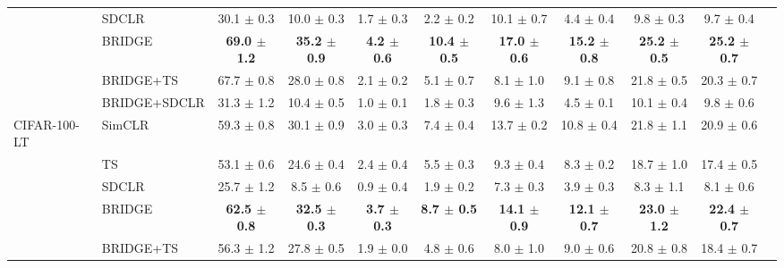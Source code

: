 \begin{table}[t]
\begin{adjustbox}{max width=\textwidth}
\begin{tabular}{l l c c c c c c c c c}
 & SDCLR & 30.1 {\scriptsize$\pm$ 0.3} & 10.0 {\scriptsize$\pm$ 0.3} & 1.7 {\scriptsize$\pm$ 0.3} & 2.2 {\scriptsize$\pm$ 0.2} & 10.1 {\scriptsize$\pm$ 0.7} & 4.4 {\scriptsize$\pm$ 0.4} & 9.8 {\scriptsize$\pm$ 0.3} & 9.7 {\scriptsize$\pm$ 0.4} \\
 & BRIDGE & \textbf{69.0 {\scriptsize$\pm$ 1.2}} & \textbf{35.2 {\scriptsize$\pm$ 0.9}} & \textbf{4.2 {\scriptsize$\pm$ 0.6}} & \textbf{10.4 {\scriptsize$\pm$ 0.5}} & \textbf{17.0 {\scriptsize$\pm$ 0.6}} & \textbf{15.2 {\scriptsize$\pm$ 0.8}} & \textbf{25.2 {\scriptsize$\pm$ 0.5}} & \textbf{25.2 {\scriptsize$\pm$ 0.7}} \\
 & BRIDGE+TS & 67.7 {\scriptsize$\pm$ 0.8} & 28.0 {\scriptsize$\pm$ 0.8} & 2.1 {\scriptsize$\pm$ 0.2} & 5.1 {\scriptsize$\pm$ 0.7} & 8.1 {\scriptsize$\pm$ 1.0} & 9.1 {\scriptsize$\pm$ 0.8} & 21.8 {\scriptsize$\pm$ 0.5} & 20.3 {\scriptsize$\pm$ 0.7} \\
 & BRIDGE+SDCLR & 31.3 {\scriptsize$\pm$ 1.2} & 10.4 {\scriptsize$\pm$ 0.5} & 1.0 {\scriptsize$\pm$ 0.1} & 1.8 {\scriptsize$\pm$ 0.3} & 9.6 {\scriptsize$\pm$ 1.3} & 4.5 {\scriptsize$\pm$ 0.1} & 10.1 {\scriptsize$\pm$ 0.4} & 9.8 {\scriptsize$\pm$ 0.6} \\
\midrule
CIFAR-100-LT & SimCLR & 59.3 {\scriptsize$\pm$ 0.8} & 30.1 {\scriptsize$\pm$ 0.9} & 3.0 {\scriptsize$\pm$ 0.3} & 7.4 {\scriptsize$\pm$ 0.4} & 13.7 {\scriptsize$\pm$ 0.2} & 10.8 {\scriptsize$\pm$ 0.4} & 21.8 {\scriptsize$\pm$ 1.1} & 20.9 {\scriptsize$\pm$ 0.6} \\
 & TS & 53.1 {\scriptsize$\pm$ 0.6} & 24.6 {\scriptsize$\pm$ 0.4} & 2.4 {\scriptsize$\pm$ 0.4} & 5.5 {\scriptsize$\pm$ 0.3} & 9.3 {\scriptsize$\pm$ 0.4} & 8.3 {\scriptsize$\pm$ 0.2} & 18.7 {\scriptsize$\pm$ 1.0} & 17.4 {\scriptsize$\pm$ 0.5} \\
 & SDCLR & 25.7 {\scriptsize$\pm$ 1.2} & 8.5 {\scriptsize$\pm$ 0.6} & 0.9 {\scriptsize$\pm$ 0.4} & 1.9 {\scriptsize$\pm$ 0.2} & 7.3 {\scriptsize$\pm$ 0.3} & 3.9 {\scriptsize$\pm$ 0.3} & 8.3 {\scriptsize$\pm$ 1.1} & 8.1 {\scriptsize$\pm$ 0.6} \\
 & BRIDGE & \textbf{62.5 {\scriptsize$\pm$ 0.8}} & \textbf{32.5 {\scriptsize$\pm$ 0.3}} & \textbf{3.7 {\scriptsize$\pm$ 0.3}} & \textbf{8.7 {\scriptsize$\pm$ 0.5}} & \textbf{14.1 {\scriptsize$\pm$ 0.9}} & \textbf{12.1 {\scriptsize$\pm$ 0.7}} & \textbf{23.0 {\scriptsize$\pm$ 1.2}} & \textbf{22.4 {\scriptsize$\pm$ 0.7}} \\
 & BRIDGE+TS & 56.3 {\scriptsize$\pm$ 1.2} & 27.8 {\scriptsize$\pm$ 0.5} & 1.9 {\scriptsize$\pm$ 0.0} & 4.8 {\scriptsize$\pm$ 0.6} & 8.0 {\scriptsize$\pm$ 1.0} & 9.0 {\scriptsize$\pm$ 0.6} & 20.8 {\scriptsize$\pm$ 0.8} & 18.4 {\scriptsize$\pm$ 0.7} \\

\end{tabular}
\end{adjustbox}
\end{table}
